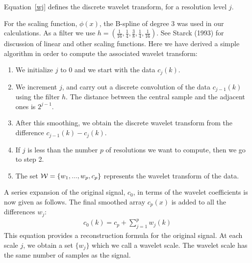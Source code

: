 Equation~\ref{wj} defines the discrete wavelet transform, for a  
resolution level $j$.

For the scaling function, $\phi(x)$, the B-spline of degree 3 
was used in our calculations. As a filter we use 
$h = ( \frac{1}{16}, \frac{1}{4}, \frac{3}{8}, \frac{1}{4}, \frac{1}{16})$. 
See  Starck (1993)
for discussion of 
linear and other scaling functions.  Here  
we have derived a simple algorithm in order to compute the 
associated wavelet transform:
\begin{enumerate}
\item We initialize $j$ to 0 and we start with the data $c_j(k)$.
\item We increment $j$, and carry out a discrete convolution of the data
$c_{j-1}(k)$ using  the filter $h$. The distance between the central sample
and the adjacent ones is $2^{j-1}$.
\item After this smoothing, we obtain the discrete wavelet transform
from the difference $c_{j-1}(k) - c_j(k)$.
\item If $j$ is less than the number $p$ of resolutions we want to
compute, then we go to step 2.
\item The set ${\cal W} = \{ w_1, ..., w_p, c_p \}$ represents the
wavelet transform of the data.
\end{enumerate}

A series expansion of the original signal, $c_0$, 
in terms of
the wavelet coefficients is now given as follows. 
The final smoothed array $c_{p}(x)$ is added to all the differences $w_j$:
\begin{eqnarray}
c_0(k) = c_{p} + \sum_{j=1}^{p} w_j(k)
\label{eqn_rec}
\end{eqnarray}
 This equation provides a reconstruction formula for the original signal. At each scale $j$, we obtain a set $\{w_j\}$ which 
we call a wavelet scale.  The  wavelet scale 
has the same number of samples as the signal. 
